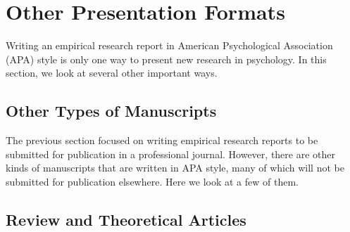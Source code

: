 \section{Other Presentation Formats}


Writing an empirical research report in American Psychological Association (APA) style is only one way to present new research in psychology. In this section, we look at several other important ways.


\subsection{Other Types of Manuscripts}

The previous section focused on writing empirical research reports to be submitted for publication in a professional journal. However, there are other kinds of manuscripts that are written in APA style, many of which will not be submitted for publication elsewhere. Here we look at a few of them.

\subsection{Review and Theoretical Articles}

